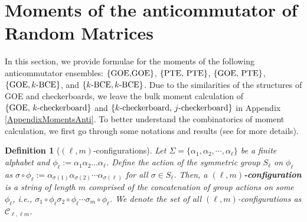 \documentclass[11pt,reqno]{amsart}
\numberwithin{equation}{section}
\theoremstyle{plain}
\newtheorem{definition}[thm]{Definition}
\begin{document}

\section{Moments of the anticommutator of Random Matrices}\label{sec: anticommutator Combinatorics}

In this section, we provide formulae for the moments of the following anticommutator ensembles: $\{\textup{GOE,}\\ \textup{GOE}\}$, $\{\textup{PTE, PTE}\}$, $\{\textup{GOE, PTE}\}$, $\{\textup{GOE}, k\textup{-BCE}\}$, and $\{k\textup{-BCE}, k\textup{-BCE}\}$. Due to the similarities of the structures of GOE and checkerboards, we leave the bulk moment calculation of $\{\textup{GOE, }k\textup{-checkerboard}\}$ and $\{k\textup{-checkerboard, }j\textup{-checkerboard}\}$ in Appendix \ref{AppendixMomentsAnti}. To better understand the combinatorics of moment calculation, we first go through some notations and results (see \cite{MS} for more details). 

\begin{definition}[$(\ell,m)$-configurations]\label{ellkconfig}
Let $\Sigma=\{\alpha_1,\alpha_2,\cdots, \alpha_\ell\}$ be a finite alphabet and $\phi_\ell:=\alpha_1\alpha_2\dots\alpha_\ell$. Define the action of the symmetric group $S_\ell$ on $\phi_\ell$ as $\sigma \circ \phi_\ell:=\alpha_{\sigma(1)}\alpha_{\sigma(2)}\cdots \alpha_{\sigma(\ell)}$ for all $\sigma\in S_\ell$. Then, a \textbf{$(\ell,m)$-configuration} is a string of length $m$ comprised of the concatenation of group actions on some $\phi_\ell$, i.e., $\sigma_1\circ \phi_\ell\sigma_2\circ \phi_\ell\cdots\sigma_m \circ \phi_\ell$. We denote the set of all $(\ell,m)$-configurations as $\mathcal{C}_{\ell,\ell m}$.
\end{definition}
\end{document}
